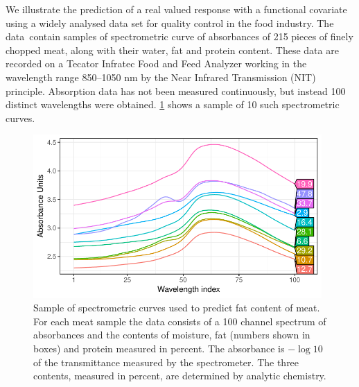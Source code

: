 \documentclass[showframe,11pt]{report}\usepackage[]{graphicx}\usepackage[]{color}
\newenvironment{knitrout}{}{} %
\begin{document}
We illustrate the prediction of a real valued response with a functional covariate using a widely analysed data set for quality control in the food industry.
The data\footnotemark~contain samples of spectrometric curve of absorbances of 215 pieces of finely chopped meat, along with their water, fat and protein content.
These data are recorded on a Tecator Infratec Food and Feed Analyzer working in the wavelength range 850--1050 nm by the Near Infrared Transmission (NIT) principle.
Absorption data has not been measured continuously, but instead 100 distinct wavelengths were obtained. \cref{fig:tecator.data} shows a sample of 10 such spectrometric curves.


\begin{knitrout}
\color{fgcolor}\begin{figure}[htb]

{\centering \includegraphics[width=11cm]{figure/04-tecator_data-1} 

}

\caption[Sample of spectrometric curves used to predict fat content of meat]{Sample of spectrometric curves used to predict fat content of meat. For each meat sample the data consists of a 100 channel spectrum of absorbances and the contents of moisture, fat (numbers shown in boxes) and protein measured in percent. The absorbance is $-\log 10$ of the transmittance measured by the spectrometer. The three contents, measured in percent, are determined by analytic chemistry.}\label{fig:tecator.data}
\end{figure}


\end{knitrout}
\end{document}
